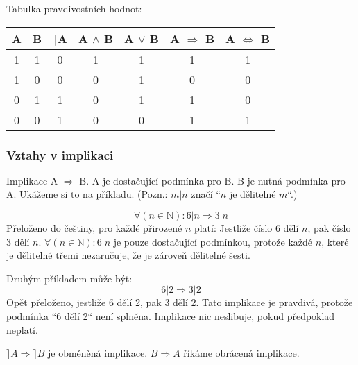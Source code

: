 \documentclass[12pt, a4paper]{scrartcl}
\begin{document}
    Tabulka pravdivostních hodnot:
    \begin{tabular}{|c|c|c|c|c|c|c|}
        \hline
        A & B & $\rceil$A & A $\wedge$ B & A $\vee$ B & A $\Rightarrow$ B & A $\Leftrightarrow$ B \\
        \hline
        1 & 1 & 0 & 1 & 1 & 1 & 1 \\
        \hline
        1 & 0 & 0 & 0 & 1 & 0 & 0 \\
        \hline
        0 & 1 & 1 & 0 & 1 & 1 & 0 \\
        \hline
        0 & 0 & 1 & 0 & 0 & 1 & 1 \\
        \hline
    \end{tabular}

    \subsubsection{Vztahy v implikaci}
    Implikace A $\Rightarrow$ B. A je dostačující podmínka pro B. B je nutná podmínka pro A.
    Ukážeme si to na příkladu. (Pozn.: $m|n$ značí ``$n$ je dělitelné $m$``.)

    \[\forall (n \in \mathds{N}): 6|n \Rightarrow 3|n\]
    Přeloženo do češtiny, pro každé přirozené $n$ platí: 
    Jestliže číslo 6 dělí $n$, pak číslo 3 dělí $n$.
    $\forall (n \in \mathds{N}): 6|n$ je pouze dostačující podmínkou, protože každé $n$, které je dělitelné třemi
    nezaručuje, že je zároveň dělitelné šesti.

    Druhým příkladem může být:
    \[6|2 \Rightarrow 3|2\]
    Opět přeloženo, jestliže 6 dělí 2, pak 3 dělí 2. Tato implikace je pravdivá, 
    protože podmínka ``6 dělí 2`` není splněna. Implikace nic neslibuje, pokud předpoklad neplatí.

    $\rceil A \Rightarrow \rceil B$ je obměněná implikace.
    $B \Rightarrow A$ říkáme obrácená implikace.
\end{document}

